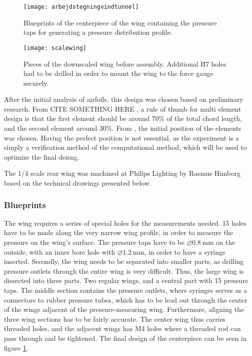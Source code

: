     \begin{figure}
      \texttt{[image: arbejdstegningvindtunnel]}
      \caption{Blueprints of the centerpiece of the wing containing the pressure taps for generating a pressure distribution profile.}
      \label{fig:scalewingblueprint}
    \end{figure}

    \begin{figure}
      \texttt{[image: scalewing]}
      \caption{Pieces of the downscaled wing before assembly. Additional H7 holes had to be drilled in order to mount the wing to the force gauge securely.}
      \label{fig:scalewingparts}
    \end{figure}

    After the initial analysis of airfoils, this design was chosen based on preliminary research. From CITE SOMETHING HERE  , a rule of thumb for multi element design is that the first element should be around $70\%$ of the total chord length, and the second element around $30\%$. From \cite{jkatz}, the initial position of the elements was chosen. Having the perfect position is not essential, as the experiment is a simply a verification method of the computational method, which will be used to optimize the final deisng.

    The 1/4 scale rear wing was machined at Philips Lighting by Rasmus Himborg based on the technical drawings presented below.

    \subsubsection{Blueprints}

      The wing requires a series of special holes for the measurements needed. 15 holes have to be made along the very narrow wing profile, in order to measure the pressure on the wing's surface. The pressure taps have to be $\diameter\SI{0.8}{\milli\metre}$ on the outside, with an inner bore hole with $\diameter\SI{1.2}{\milli\metre}$, in order to have a syringe inserted. Secondly, the wing needs to be separated into smaller parts, as drilling pressure outlets through the entire wing is very difficult. Thus, the large wing is dissected into three parts. Two regular wings, and a central part with 15 pressure taps. The middle section contains the pressure outlets, where syringes serves as a connectors to rubber pressure tubes, which has to be lead out through the center of the wings adjacent of the pressure-measuring wing. Furthermore, aligning the three wing sections has to be fairly accurate. The center wing thus carries threaded holes, and the adjacent wings has M4 holes where a threaded rod can pass through and be tightened. The final design of the centerpiece can be seen in figure \ref{fig:scalewingblueprint}.

